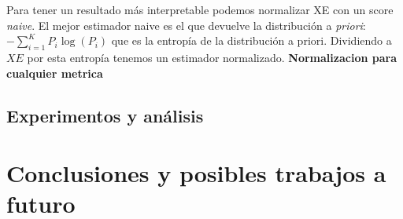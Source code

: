 \documentclass[11pt,a4paper,twoside]{tesis}
\begin{document}
Para tener un resultado más interpretable podemos normalizar XE con un score \textit{naive}. El mejor estimador naive es el que devuelve la distribución a \textit{priori}: $-\sum_{i=1}^K P_i \log(P_i)$ que es la entropía de la distribución a priori. Dividiendo a $XE$ por esta entropía tenemos un estimador normalizado.
\textbf{Normalizacion para cualquier metrica}

\section{Experimentos y análisis}



\chapter{Conclusiones y posibles trabajos a futuro}

\end{document}
